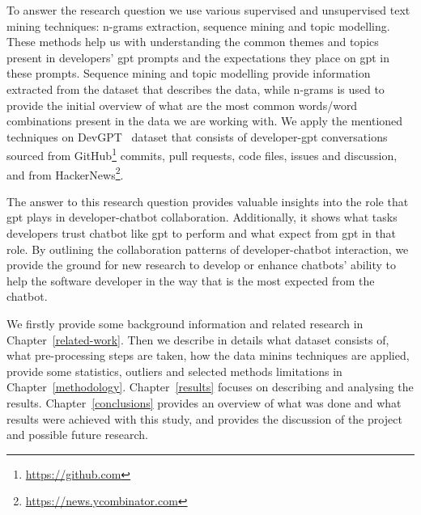 To answer the research question we use various supervised and unsupervised text mining techniques: n-grams extraction, sequence mining and topic modelling. These methods help us with understanding the common themes and topics present in developers' \gls{gpt} prompts and the expectations they place on \gls{gpt} in these prompts. Sequence mining and topic modelling provide information extracted from the dataset that describes the data, while n-grams is used to provide the initial overview of what are the most common words/word combinations present in the data we are working with. We apply the mentioned techniques on DevGPT~\cite{devgpt} dataset that consists of developer-\gls{gpt} conversations sourced from GitHub\footnote{\url{https://github.com}} commits, pull requests, code files, issues and discussion, and from HackerNews\footnote{\url{https://news.ycombinator.com}}. 

The answer to this research question provides valuable insights into the role that \gls{gpt} plays in developer-chatbot collaboration. Additionally, it shows what tasks developers trust chatbot like \gls{gpt} to perform and what expect from \gls{gpt} in that role. By outlining the collaboration patterns of developer-chatbot interaction, we provide the ground for new research to develop or enhance chatbots' ability to help the software developer in the way that is the most expected from the chatbot.

We firstly provide some background information and related research in Chapter~\ref{related-work}. Then we describe in details what dataset consists of, what pre-processing steps are taken, how the data minins techniques are applied, provide some statistics, outliers and selected methods limitations in Chapter~\ref{methodology}. Chapter~\ref{results} focuses on describing and analysing the results. Chapter~\ref{conclusions} provides an overview of what was done and what results were achieved with this study, and provides the discussion of the project and possible future research. 
